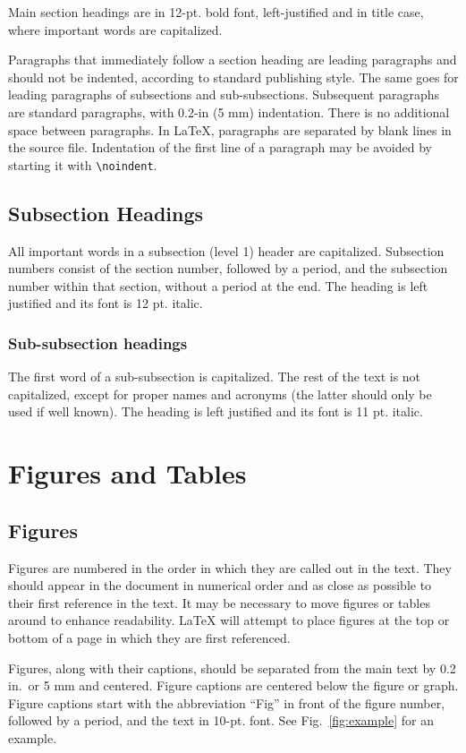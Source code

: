 \documentclass[12pt]{spieman}  %
\begin{document}
\begin{spacing}{2}
Main section headings are in 12-pt. bold font, left-justified and in title case, where important words are capitalized.

Paragraphs that immediately follow a section heading are leading paragraphs and should not be indented, according to standard publishing style. The same goes for leading paragraphs of subsections and sub-subsections. Subsequent paragraphs are standard paragraphs, with 0.2-in (5 mm) indentation. There is no additional space between paragraphs. In LaTeX, paragraphs are separated by blank lines in the source file. Indentation of the first line of a paragraph may be avoided by starting it with \verb|\noindent|.

\subsection{Subsection Headings}
All important words in a subsection (level 1) header are capitalized. Subsection numbers consist of the section number, followed by a period, and the subsection number within that section, without a period at the end. The heading is left justified and its font is 12 pt. italic.

\subsubsection{Sub-subsection headings}
The first word of a sub-subsection is capitalized. The rest of the text is not capitalized, except for proper names and acronyms (the latter should only be used if well known). The heading is left justified and its font is 11 pt. italic.

\section{Figures and Tables}

\subsection{Figures}

Figures are numbered in the order in which they are called out in the text. They should appear in the document in numerical order and as close as possible to their first reference in the text. It may be necessary to move figures or tables around to enhance readability. LaTeX will attempt to place figures at the top or bottom of a page in which they are first referenced.

Figures, along with their captions, should be separated from the main text by  0.2 in.\ or 5 mm and centered. Figure captions are centered below the figure or graph. Figure captions start with the abbreviation ``Fig'' in front of the figure number, followed by a period, and the text in 10-pt. font. See Fig.~\ref{fig:example} for an example.


\end{spacing}
\end{document}
